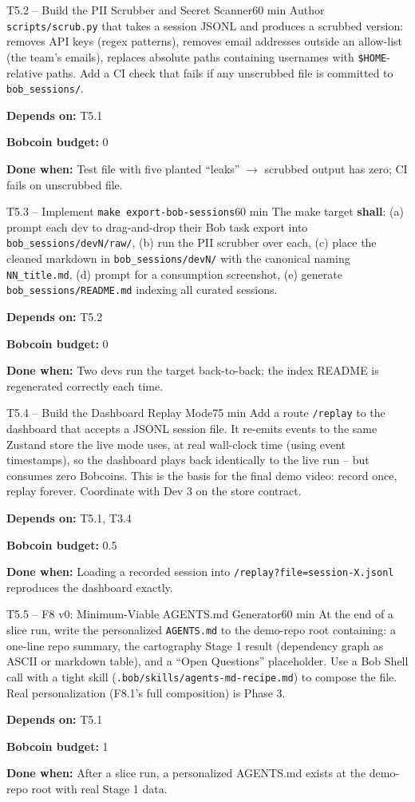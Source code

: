 \documentclass[11pt,letterpaper]{article}
\newcommand{\acceptance}[1]{\par\smallskip\textcolor{ibmgreen}{\textbf{Done when:}} #1}
\newcommand{\depends}[1]{\par\smallskip\textcolor{ibmorange}{\textbf{Depends on:}} #1}
\newcommand{\bobcost}[1]{\par\smallskip\textcolor{ibmaccent}{\textbf{Bobcoin budget:}} #1}
\newcommand{\shall}{\textbf{shall}}
\begin{document}
\begin{task}{T5.2 -- Build the PII Scrubber and Secret Scanner}{60 min}
Author \texttt{scripts/scrub.py} that takes a session JSONL and produces a scrubbed version: removes API keys (regex patterns), removes email addresses outside an allow-list (the team's emails), replaces absolute paths containing usernames with \texttt{\$HOME}-relative paths. Add a CI check that fails if any unscrubbed file is committed to \texttt{bob\_sessions/}.
\depends{T5.1}
\bobcost{0}
\acceptance{Test file with five planted ``leaks'' $\rightarrow$ scrubbed output has zero; CI fails on unscrubbed file.}
\end{task}

\begin{task}{T5.3 -- Implement \texttt{make export-bob-sessions}}{60 min}
The make target \shall{}: (a) prompt each dev to drag-and-drop their Bob task export into \texttt{bob\_sessions/devN/raw/}, (b) run the PII scrubber over each, (c) place the cleaned markdown in \texttt{bob\_sessions/devN/} with the canonical naming \texttt{NN\_title.md}, (d) prompt for a consumption screenshot, (e) generate \texttt{bob\_sessions/README.md} indexing all curated sessions.
\depends{T5.2}
\bobcost{0}
\acceptance{Two devs run the target back-to-back; the index README is regenerated correctly each time.}
\end{task}

\begin{task}{T5.4 -- Build the Dashboard Replay Mode}{75 min}
Add a route \texttt{/replay} to the dashboard that accepts a JSONL session file. It re-emits events to the same Zustand store the live mode uses, at real wall-clock time (using event timestamps), so the dashboard plays back identically to the live run -- but consumes zero Bobcoins. This is the basis for the final demo video: record once, replay forever. Coordinate with Dev 3 on the store contract.
\depends{T5.1, T3.4}
\bobcost{0.5}
\acceptance{Loading a recorded session into \texttt{/replay?file=session-X.jsonl} reproduces the dashboard exactly.}
\end{task}

\begin{task}{T5.5 -- F8 v0: Minimum-Viable AGENTS.md Generator}{60 min}
At the end of a slice run, write the personalized \texttt{AGENTS.md} to the demo-repo root containing: a one-line repo summary, the cartography Stage 1 result (dependency graph as ASCII or markdown table), and a ``Open Questions'' placeholder. Use a Bob Shell call with a tight skill (\texttt{.bob/skills/agents-md-recipe.md}) to compose the file. Real personalization (F8.1's full composition) is Phase 3.
\depends{T5.1}
\bobcost{1}
\acceptance{After a slice run, a personalized AGENTS.md exists at the demo-repo root with real Stage 1 data.}
\end{task}
\end{document}
